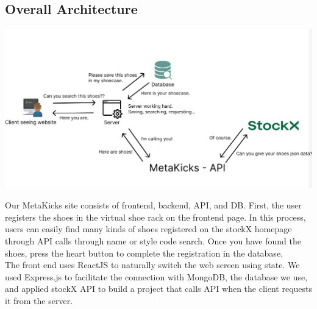 \documentclass[conference]{IEEEtran}
\begin{document}
\subsection{Overall Architecture}
\centerline{\includegraphics[scale=0.2]{pics/service_construct.png}}
Our MetaKicks site consists of frontend, backend, API, and DB. First, the user registers the shoes in the virtual shoe rack on the frontend page. In this process, users can easily find many kinds of shoes registered on the stockX homepage through API calls through name or style code search. Once you have found the shoes, press the heart button to complete the registration in the database.\\
The front end uses ReactJS to naturally switch the web screen using state. We used Express.js to facilitate the connection with MongoDB, the database we use, and applied stockX API to build a project that calls API when the client requests it from the server.\\
\end{document}
